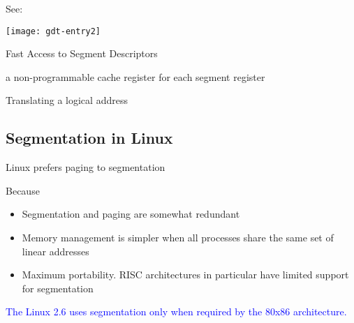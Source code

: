 See: 

\begin{center}
  \texttt{[image: gdt-entry2]}
\end{center}

\begin{frame}{Fast Access to Segment Descriptors}
  \begin{block}{a non-programmable cache register for each segment register}
    \begin{center}
    \end{center}
  \end{block}
\end{frame}

\begin{frame}{Translating a logical address}
\end{frame}

\subsection{Segmentation in Linux}

\begin{frame}{Linux prefers paging to segmentation}
  \begin{block}{Because}
  \begin{itemize}
  \item Segmentation and paging are somewhat redundant
  \item Memory management is simpler when all processes share the same set of linear addresses
  \item Maximum portability. RISC architectures in particular have limited support for segmentation
  \end{itemize}
  \end{block}
  \textcolor{blue}{The Linux 2.6 uses segmentation only when required by the 80x86 architecture.}
\end{frame}

